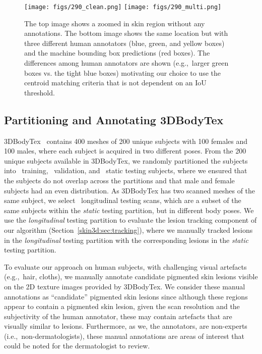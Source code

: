 \documentclass[journal]{IEEEtran}
\def\ie{i.e.,~}
\def\eg{e.g.,~}
\begin{document}
\begin{figure}[htb]
\centering
\texttt{[image: figs/290\_clean.png]}
\texttt{[image: figs/290\_multi.png]}
\caption{The top image shows a zoomed in skin region without any annotations. The bottom image shows the same location but with three different human annotators (blue, green, and yellow boxes) and the machine bounding box predictions (red boxes). The differences among human annotators are shown (\eg larger green boxes vs. the tight blue boxes) motivating our choice to use the centroid matching criteria that is not dependent on an IoU threshold.}
\label{skin3d:fig:bodytex-multi-annotator}
\end{figure}


\subsection{Partitioning and Annotating 3DBodyTex}
\label{skin3d:sec:annoate-bodytex}
3DBodyTex~\citep{Saint2018} contains 400 meshes of 200 unique subjects with 100 females and 100 males, where each subject is acquired in two different poses. From the 200 unique subjects available in 3DBodyTex, we randomly partitioned the subjects into \numberBodyTexTrainSubjects~training, \numberBodyTexValidSubjects~validation, and \numberBodyTexTestSubjects~static testing subjects, where we ensured that the subjects do not overlap across the partitions and that male and female subjects had an even distribution. As 3DBodyTex has two scanned meshes of the same subject, we select \numberBodyTexLongScans~longitudinal testing scans, which are a subset of the same subjects within the \emph{static} testing partition, but in different body poses. We use the \emph{longitudinal} testing partition to evaluate the lesion tracking component of our algorithm (Section~\ref{skin3d:sec:tracking}), where we manually tracked lesions in the \emph{longitudinal} testing partition with the corresponding lesions in the \emph{static} testing partition. 

To evaluate our approach on human subjects, with challenging visual artefacts (\eg hair, cloths), we manually annotate candidate pigmented skin lesions visible on the 2D texture images provided by 3DBodyTex. We consider these manual annotations as ``candidate''  pigmented skin lesions since although these regions appear to contain a pigmented skin lesion, given the scan resolution and the subjectivity of the human annotator, these may contain artefacts that are visually similar to lesions. Furthermore, as we, the annotators, are non-experts (\ie non-dermatologists), these manual annotations are areas of interest that could be noted for the dermatologist to review. 
\end{document}
